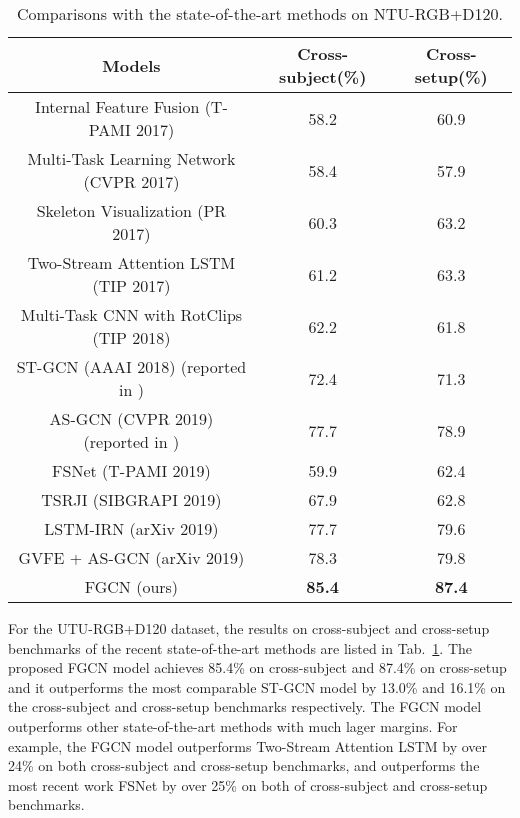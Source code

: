 \documentclass[runningheads]{llncs}
\begin{document}
\begin{table}[b]
	\caption{Comparisons with the state-of-the-art methods on NTU-RGB+D120.}
	\label{tab-state-rgbd120}
	\tabcolsep=4pt
	\centering
	\begin{tabular}{ccc}
		\hline
		Models & Cross-subject(\%) & Cross-setup(\%) \\
		\hline		
		Internal Feature Fusion (T-PAMI 2017) \cite{liu2017skeleton}	&58.2	&60.9 \\
		Multi-Task Learning Network (CVPR 2017) \cite{ke2017new}	&58.4	&57.9 \\
		Skeleton Visualization (PR 2017) \cite{liu2017enhanced}	&60.3	&63.2\\
		Two-Stream Attention LSTM (TIP 2017) \cite{liu2017skeleton-tip} 	&61.2	&63.3 \\
		Multi-Task CNN with RotClips (TIP 2018) \cite{ke2018learning}	&62.2	&61.8 \\
		ST-GCN (AAAI 2018) (reported in \cite{papadopoulos2019vertex})	&72.4 & 71.3	\\
		AS-GCN (CVPR 2019) (reported in \cite{papadopoulos2019vertex}) &77.7 & 78.9 \\
		FSNet (T-PAMI 2019) \cite{liu2019skeleton}	&59.9	&62.4 \\
		TSRJI (SIBGRAPI 2019) \cite{caetano2019skeleton} &67.9	&62.8  \\
		LSTM-IRN (arXiv 2019) \cite{perez2019interaction}	&77.7	&79.6  \\
		GVFE + AS-GCN (arXiv 2019) \cite{papadopoulos2019vertex}	&78.3	&79.8 \\
		\hline
		FGCN (ours)	&\textbf{85.4}	&\textbf{87.4} \\
		\hline
	\end{tabular}
\end{table}

For the UTU-RGB+D120 dataset, the results on cross-subject and cross-setup benchmarks of the recent state-of-the-art methods are listed in Tab.~\ref{tab-state-rgbd120}. The proposed FGCN model achieves 85.4\% on cross-subject and 87.4\% on cross-setup and it outperforms the most comparable ST-GCN model \cite{yan2018spatial} by 13.0\% and 16.1\% on the cross-subject and cross-setup benchmarks respectively. The FGCN model outperforms other state-of-the-art methods with much lager margins. For example, the FGCN model outperforms Two-Stream Attention LSTM \cite{liu2017skeleton-tip} by over 24\% on both cross-subject and cross-setup benchmarks, and outperforms the most recent work FSNet \cite{liu2019skeleton} by over 25\% on both of cross-subject and cross-setup benchmarks.
\end{document}
